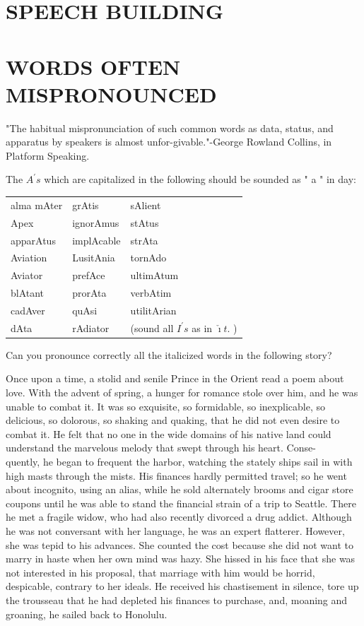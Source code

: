 \documentclass[10pt]{article}
\begin{document}
\section*{SPEECH BUILDING}
\section*{WORDS OFTEN MISPRONOUNCED}
"The habitual mispronunciation of such common words as data, status, and apparatus by speakers is almost unfor-givable."-George Rowland Collins, in Platform Speaking.

The $A^{\prime} s$ which are capitalized in the following should be sounded as " a " in day:

\begin{center}
\begin{tabular}{lll}
alma mAter & grAtis & sAlient \\
Apex & ignorAmus & stAtus \\
apparAtus & implAcable & strAta \\
Aviation & LusitAnia & tornAdo \\
Aviator & prefAce & ultimAtum \\
blAtant & prorAta & verbAtim \\
cadAver & quAsi & utilitArian \\
dAta & rAdiator & (sound all $I^{\prime} s$ as in $\check{\imath} t$. ) \\
\end{tabular}
\end{center}

Can you pronounce correctly all the italicized words in the following story?

Once upon a time, a stolid and senile Prince in the Orient read a poem about love. With the advent of spring, a hunger for romance stole over him, and he was unable to combat it. It was so exquisite, so formidable, so inexplicable, so delicious, so dolorous, so shaking and quaking, that he did not even desire to combat it. He felt that no one in the wide domains of his native land could understand the marvelous melody that swept through his heart. Conse-\\
quently, he began to frequent the harbor, watching the stately ships sail in with high masts through the mists. His finances hardly permitted travel; so he went about incognito, using an alias, while he sold alternately brooms and cigar store coupons until he was able to stand the financial strain of a trip to Seattle. There he met a fragile widow, who had also recently divorced a drug addict. Although he was not conversant with her language, he was an expert flatterer. However, she was tepid to his advances. She counted the cost because she did not want to marry in haste when her own mind was hazy. She hissed in his face that she was not interested in his proposal, that marriage with him would be horrid, despicable, contrary to her ideals. He received his chastisement in silence, tore up the trousseau that he had depleted his finances to purchase, and, moaning and groaning, he sailed back to Honolulu.
\end{document}
